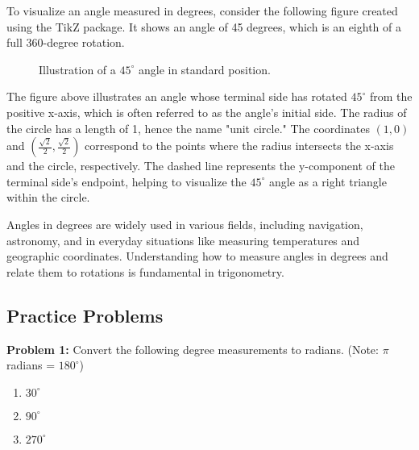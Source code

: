 \documentclass[a4paper,12pt]{book}
\newcounter{problem}
\begin{document}
To visualize an angle measured in degrees, consider the following figure created using the TikZ package. It shows an angle of 45 degrees, which is an eighth of a full 360-degree rotation.

\begin{figure}[h]
\centering
{}
\caption{Illustration of a \(45^\circ\) angle in standard position.}
\label{fig:45degangle}
\end{figure}

The figure above illustrates an angle whose terminal side has rotated \(45^\circ\) from the positive x-axis, which is often referred to as the angle's initial side. The radius of the circle has a length of 1, hence the name "unit circle." The coordinates \((1,0)\) and \((\frac{\sqrt{2}}{2},\frac{\sqrt{2}}{2})\) correspond to the points where the radius intersects the x-axis and the circle, respectively. The dashed line represents the y-component of the terminal side's endpoint, helping to visualize the \(45^\circ\) angle as a right triangle within the circle.

Angles in degrees are widely used in various fields, including navigation, astronomy, and in everyday situations like measuring temperatures and geographic coordinates. Understanding how to measure angles in degrees and relate them to rotations is fundamental in trigonometry.

\subsection*{Practice Problems}
\label{subsec:practice_problems_degree}

\textbf{Problem 1:} Convert the following degree measurements to radians. (Note: \( \pi \) radians = \( 180^\circ \))
\begin{enumerate}[label=\alph*.]
  \item \( 30^\circ \)
  \item \( 90^\circ \)
  \item \( 270^\circ \)
\end{enumerate}
\end{document}

